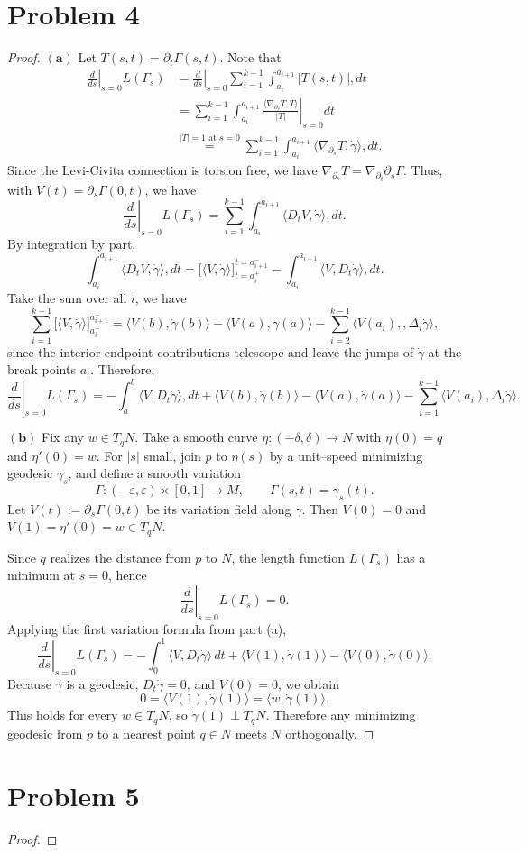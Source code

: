\documentclass[12pt]{article}
\begin{document}
\section*{Problem 4}
\begin{proof}
  $\mathbf{(a)}$ Let $T(s,t)=\partial_t \Gamma(s,t)$. Note that 
  $$
  \begin{aligned}
\left.\frac{d}{ds}\right|_{s=0} L(\Gamma_s)
&=\left.\frac{d}{ds}\right|_{s=0}\sum_{i=1}^{k-1}\int_{a_i}^{a_{i+1}}|T(s,t)|,dt\\
&=\sum_{i=1}^{k-1}\int_{a_i}^{a_{i+1}}
\left.\frac{\langle\nabla_{\partial_s}T,T\rangle}{|T|}\right|_{s=0} dt\\
&\overset{|T|=1\text{ at }s=0}{=}\sum_{i=1}^{k-1}\int_{a_i}^{a_{i+1}}
\langle\nabla_{\partial_s}T,\dot\gamma\rangle,dt .
\end{aligned}
  $$
  Since the Levi-Civita connection is torsion free, we have $\nabla_{\partial_s}T=\nabla_{\partial_t}\partial_s\Gamma.$
  Thus, with $V(t)=\partial_s\Gamma(0,t)$, we have 
  $$
  \left.\frac{d}{ds}\right|_{s=0} L(\Gamma_s)=\sum_{i=1}^{k-1}\int_{a_i}^{a_{i+1}}\langle D_t V,\dot\gamma\rangle,dt .
  $$
  By integration by part, 
  $$
  \int_{a_i}^{a_{i+1}}\langle D_t V,\dot\gamma\rangle,dt=\big[\langle V,\dot\gamma\rangle\big]_{t=a_i^+}^{t=a_{i+1}^-}
-\int_{a_i}^{a_{i+1}}\langle V, D_t\dot\gamma\rangle,dt .
  $$
  Take the sum over all $i$, we have 
  $$
  \sum_{i=1}^{k-1}\big[\langle V,\dot\gamma\rangle\big]_{a_i^+}^{a_{i+1}^-}
= \langle V(b),\dot\gamma(b)\rangle-\langle V(a),\dot\gamma(a)\rangle
-\sum_{i=2}^{k-1}\langle V(a_i),,\Delta_i\dot\gamma\rangle ,
$$
since the interior endpoint contributions telescope and leave the jumps of
$\dot\gamma$ at the break points $a_i$. Therefore, 
$$
\left.\frac{d}{ds}\right|_{s=0} L(\Gamma_s)
= -\int_{a}^{b}\langle V, D_t\dot\gamma\rangle,dt
+\langle V(b),\dot\gamma(b)\rangle
-\langle V(a),\dot\gamma(a)\rangle
-\sum_{i=1}^{k-1}\langle V(a_i),\Delta_i\dot\gamma\rangle.
$$

$\mathbf{(b)}$ 
Fix any $w\in T_qN$. Take a smooth curve $\eta:(-\delta,\delta)\to N$ with
$\eta(0)=q$ and $\eta'(0)=w$. For $|s|$ small, join $p$ to $\eta(s)$ by a
unit--speed minimizing geodesic $\gamma_s$, and define a smooth variation
\[
\Gamma:(-\varepsilon,\varepsilon)\times[0,1]\to M,\qquad
\Gamma(s,t)=\gamma_s(t).
\]
Let $V(t):=\partial_s\Gamma(0,t)$ be its variation field along $\gamma$.
Then $V(0)=0$ and $V(1)=\eta'(0)=w\in T_qN$.

Since $q$ realizes the distance from $p$ to $N$, the length function
$L(\Gamma_s)$ has a minimum at $s=0$, hence
\[
\left.\frac{d}{ds}\right|_{s=0} L(\Gamma_s)=0.
\]
Applying the first variation formula from part (a),
\[
\left.\frac{d}{ds}\right|_{s=0}L(\Gamma_s)
= -\int_{0}^{1}\!\langle V, D_t\dot\gamma\rangle\,dt
   +\langle V(1),\dot\gamma(1)\rangle
   -\langle V(0),\dot\gamma(0)\rangle .
\]
Because $\gamma$ is a geodesic, $D_t\dot\gamma=0$, and $V(0)=0$, we obtain
\[
0=\langle V(1),\dot\gamma(1)\rangle=\langle w,\dot\gamma(1)\rangle .
\]
This holds for every $w\in T_qN$, so $\dot\gamma(1)\perp T_qN$. Therefore any
minimizing geodesic from $p$ to a nearest point $q\in N$ meets $N$
orthogonally.
\end{proof}
\section*{Problem 5}
\begin{proof}
  
\end{proof}
\end{document}
